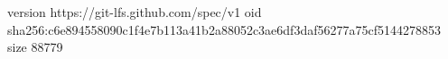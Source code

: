 version https://git-lfs.github.com/spec/v1
oid sha256:c6e894558090c1f4e7b113a41b2a88052c3ae6df3daf56277a75cf5144278853
size 88779
